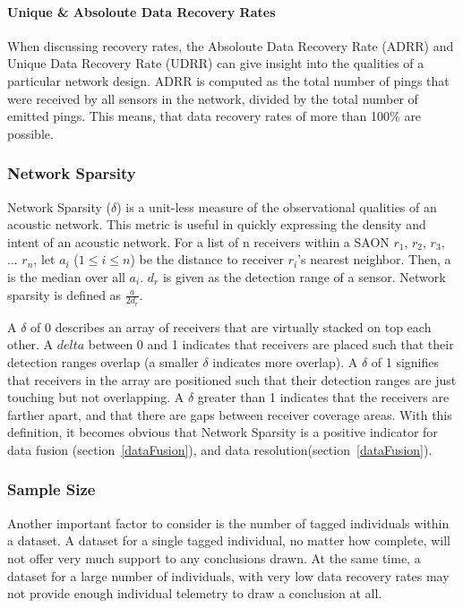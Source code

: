 \paragraph{Unique \& Absoloute Data Recovery Rates}
When discussing recovery rates, the Absoloute Data Recovery Rate (ADRR) and Unique Data Recovery Rate (UDRR) can give insight into the qualities of a particular network design.  ADRR is computed as the total number of pings that were received by all sensors in the network, divided by the total number of emitted pings.  This means, that data recovery rates of more than 100$\%$ are possible.  

\subsubsection{Network Sparsity}
\label{delta}
Network Sparsity ($\delta$) is a unit-less measure of the observational qualities of an acoustic network.  This metric is useful in quickly expressing the density and intent of an acoustic network.  For a list of n receivers within a SAON $r_1$, $r_2$, $r_3$, ... $r_n$, let $a_i$ ($1\le i \le n$) be the distance to receiver $r_i$'s nearest neighbor.  Then, a is the median over all $a_i$.  $d_r$ is given as the detection range of a sensor.  Network sparsity is defined as $\frac{a}{2d_r}$.  

A $\delta$ of 0 describes an array of receivers that are virtually stacked on top each other.  A $delta$ between 0 and 1 indicates that receivers are placed such that their detection ranges overlap (a smaller $\delta$ indicates more overlap).  A $\delta$ of 1 signifies that receivers in the array are positioned such that their detection ranges are just touching but not overlapping.  A $\delta$ greater than 1 indicates that the receivers are farther apart, and that there are gaps between receiver coverage areas.  
With this definition, it becomes obvious that Network Sparsity is a positive indicator for data
fusion (section~\ref{dataFusion}), and data resolution(section~\ref{dataFusion}).


\subsubsection{Sample Size}
\label{sampleSize}
Another important factor to consider is the number of tagged individuals within a dataset.  A dataset for a single tagged individual, no matter how complete, will not offer very much support to any conclusions drawn.  At the same time, a dataset for a large number of individuals, with very low data recovery rates may not provide enough individual telemetry to draw a conclusion at all.

